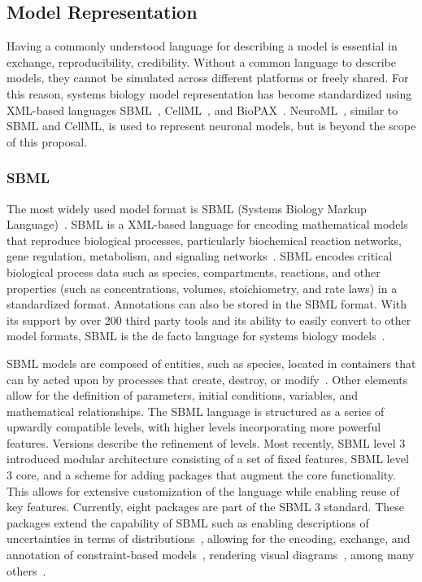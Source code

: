 \documentclass[12pt]{report}
\begin{document}
\subsection{Model Representation}
Having a commonly understood language for describing a model is essential in exchange, reproducibility, credibility. Without a common language to describe models, they cannot be simulated across different platforms or freely shared. For this reason, systems biology model representation has become standardized using XML-based languages SBML~\cite{Klipp2007StandardsIC, machado_modeling_2011}, CellML~\cite{CellML}, and BioPAX~\cite{demir_biopax_2010}. NeuroML~\cite{Gleeson2010}, similar to SBML and CellML, is used to represent neuronal models, but is beyond the scope of this proposal.  

\subsubsection{SBML}

The most widely used model format is SBML (Systems Biology Markup Language)~\cite{SBML, Finney2003, Klipp2007StandardsIC, machado_modeling_2011}. SBML is a XML-based language for encoding mathematical models that reproduce biological processes, particularly biochemical reaction networks, gene regulation, metabolism, and signaling networks~\cite{SBML, Kohl2011}. SBML encodes critical biological process data such as species, compartments, reactions, and other properties (such as concentrations, volumes, stoichiometry, and rate laws) in a standardized format. Annotations can also be stored in the SBML format. With its support by over 200 third party tools and its ability to easily convert to other model formats, SBML is the de facto language for systems biology models~\cite{Kohl2011, machado_modeling_2011}.

SBML models are composed of entities, such as species, located in containers that can by acted upon by processes that create, destroy, or modify~\cite{Keating2020}. Other elements allow for the definition of parameters, initial conditions, variables, and mathematical relationships. The SBML language is structured as a series of upwardly compatible levels, with higher levels incorporating more powerful features. Versions describe the refinement of levels. Most recently, SBML level 3 introduced modular architecture consisting of a set of fixed features, SBML level 3 core, and a scheme for adding packages that augment the core functionality. This allows for extensive customization of the language while enabling reuse of key features. Currently, eight packages are part of the SBML 3 standard. These packages extend the capability of SBML such as enabling descriptions of uncertainties in terms of distributions~\cite{Smith2020}, allowing for the encoding, exchange, and annotation of constraint-based models~\cite{Olivier2018},  rendering visual diagrams~\cite{Gauges2015}, among many others~\cite{Keating2020}. 
\end{document}
